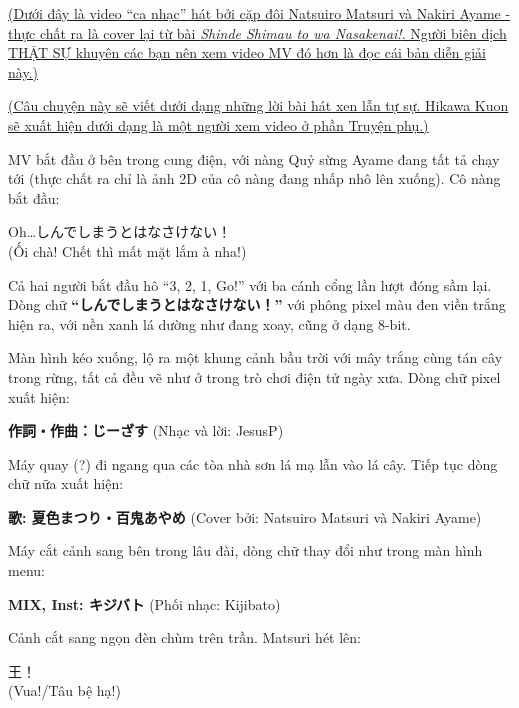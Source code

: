 \documentclass[../main.tex]{subfiles}
\begin{document}
\begin{center}
  \uline{(Dưới đây là video ``ca nhạc'' hát bởi cặp đôi Natsuiro Matsuri và Nakiri Ayame - thực chất ra là cover lại từ bài \textit{Shinde Shimau to wa Nasakenai!}. Người biên dịch THẬT SỰ khuyên các bạn nên xem video MV đó hơn là đọc cái bản diễn giải này.)}


  \uline{(Câu chuyện này sẽ viết dưới dạng những lời bài hát xen lẫn tự sự. Hikawa Kuon sẽ xuất hiện dưới dạng là một người xem video ở phần {\abv Truyện phụ}.)}
\end{center}

\il


MV bắt đầu ở bên trong cung điện, với nàng Quỷ sừng Ayame đang tất tả chạy tới (thực chất ra chỉ là ảnh 2D của cô nàng đang nhấp nhô lên xuống). Cô nàng bắt đầu:
\begin{dialogue}
   Oh…しんでしまうとはなさけない！ \\ (Ối chà! Chết thì mất mặt lắm à nha!)
\end{dialogue}

Cả hai người bắt đầu hô ``3, 2, 1, Go!'' với ba cánh cổng lần lượt đóng sầm lại. Dòng chữ
\textbf{``しんでしまうとはなさけない！''} với phông pixel màu đen viền trắng hiện ra, với nền xanh lá dường như đang xoay, cũng ở dạng 8-bit.


Màn hình kéo xuống, lộ ra một khung cảnh bầu trời với mây trắng cùng tán cây trong rừng, tất cả đều vẽ như ở trong trò chơi điện tử ngày xưa. Dòng chữ pixel xuất hiện:

\textbf{作詞・作曲：じーざす} \hfill (Nhạc và lời: JesusP)

Máy quay (?) đi ngang qua các tòa nhà sơn lá mạ lẫn vào lá cây. Tiếp tục dòng chữ nữa xuất hiện:

\textbf{歌: 夏色まつり・百鬼あやめ} \hfill (Cover bởi: Natsuiro Matsuri và Nakiri Ayame)

Máy cắt cảnh sang bên trong lâu đài, dòng chữ thay đổi như trong màn hình menu:

\textbf{MIX, Inst: キジバト} \hfill (Phối nhạc: Kijibato)

Cảnh cắt sang ngọn đèn chùm trên trần. Matsuri hét lên:
\begin{dialogue}
   王！ \\ (Vua!/Tâu bệ hạ!)
\end{dialogue}
\end{document}
